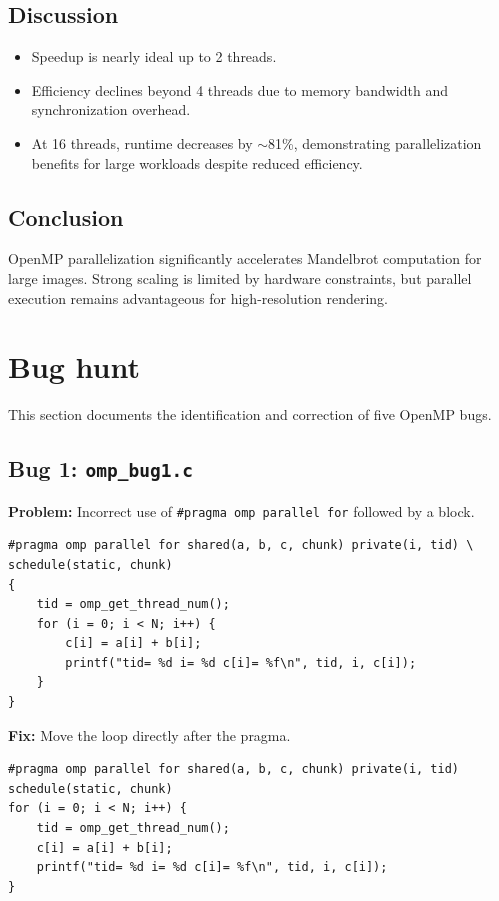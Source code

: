 \documentclass[unicode,11pt,a4paper,oneside,numbers=endperiod,openany]{scrartcl}
\begin{document}
\subsection{Discussion}
\begin{itemize}
\item Speedup is nearly ideal up to 2 threads.
\item Efficiency declines beyond 4 threads due to memory bandwidth and synchronization overhead.
\item At 16 threads, runtime decreases by $\sim$81\%, demonstrating parallelization benefits for large workloads despite reduced efficiency.
\end{itemize}

\subsection{Conclusion}
OpenMP parallelization significantly accelerates Mandelbrot computation for large images. Strong scaling is limited by hardware constraints, but parallel execution remains advantageous for high-resolution rendering.


\newpage
\section{Bug hunt }

This section documents the identification and correction of five OpenMP bugs.

\subsection{Bug 1: \texttt{omp\_bug1.c}}

\textbf{Problem:} Incorrect use of \texttt{\#pragma omp parallel for} followed by a block.

\begin{lstlisting}[caption=Buggy Code]
#pragma omp parallel for shared(a, b, c, chunk) private(i, tid) \
schedule(static, chunk)
{
    tid = omp_get_thread_num();
    for (i = 0; i < N; i++) {
        c[i] = a[i] + b[i];
        printf("tid= %d i= %d c[i]= %f\n", tid, i, c[i]);
    }
}
\end{lstlisting}

\textbf{Fix:} Move the loop directly after the pragma.

\begin{lstlisting}[caption=Corrected Code]
#pragma omp parallel for shared(a, b, c, chunk) private(i, tid) schedule(static, chunk)
for (i = 0; i < N; i++) {
    tid = omp_get_thread_num();
    c[i] = a[i] + b[i];
    printf("tid= %d i= %d c[i]= %f\n", tid, i, c[i]);
}
\end{lstlisting}
\end{document}
